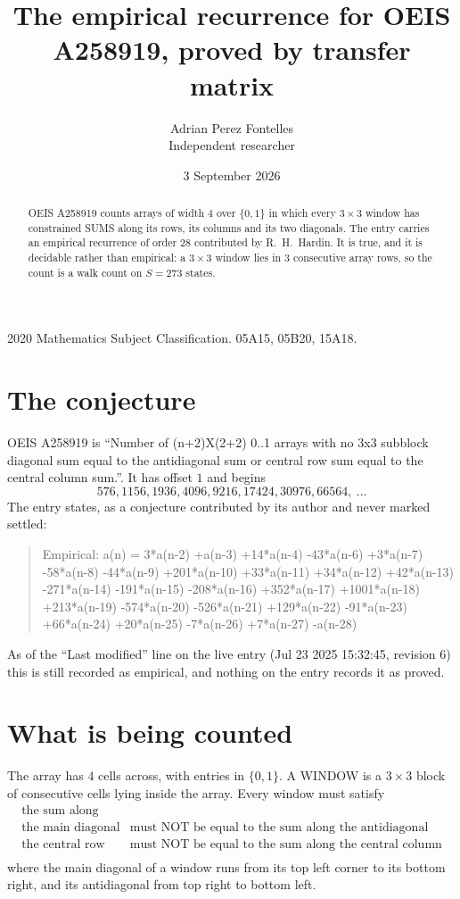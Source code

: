 \documentclass[11pt,a4paper]{article}
\title{The empirical recurrence for OEIS A258919, proved by transfer matrix}
\author{Adrian Perez Fontelles\\ \small Independent researcher}
\date{3 September 2026}
\theoremstyle{plain}
\theoremstyle{definition}
\begin{document}
\maketitle

\begin{abstract}
OEIS A258919 counts arrays of width $4$ over $\{0,1\}$ in which every $3\times3$ window has
constrained SUMS along its rows, its columns and its two diagonals. The entry carries an
empirical recurrence of order $28$ contributed by R.~H.~Hardin. It is true, and it is
decidable rather than empirical: a $3\times3$ window lies in $3$ consecutive array rows,
so the count is a walk count on $S=273$ states.
\end{abstract}

\noindent\small 2020 Mathematics Subject Classification. 05A15, 05B20, 15A18.\normalsize

\section{The conjecture}

OEIS A258919 is ``Number of (n+2)X(2+2) 0..1 arrays with no 3x3 subblock diagonal sum equal to the antidiagonal sum or central row sum equal to the central column sum.''. It has offset $1$ and begins
\[
576, 1156, 1936, 4096, 9216, 17424, 30976, 66564,\ \dots
\]
The entry states, as a conjecture contributed by its author and never marked settled:
\begin{quote}
Empirical: a(n) = 3*a(n-2) +a(n-3) +14*a(n-4) -43*a(n-6) +3*a(n-7) -58*a(n-8) -44*a(n-9) +201*a(n-10) +33*a(n-11) +34*a(n-12) +42*a(n-13) -271*a(n-14) -191*a(n-15) -208*a(n-16) +352*a(n-17) +1001*a(n-18) +213*a(n-19) -574*a(n-20) -526*a(n-21) +129*a(n-22) -91*a(n-23) +66*a(n-24) +20*a(n-25) -7*a(n-26) +7*a(n-27) -a(n-28)
\end{quote}
As of the ``Last modified'' line on the live entry (Jul 23 2025 15:32:45, revision 6) this is still
recorded as empirical, and nothing on the entry records it as proved.

\section{What is being counted}

The array has $4$ cells across, with entries in $\{0,1\}$. A WINDOW is a $3\times3$ block
of consecutive cells lying inside the array. Every window must satisfy
\[
\begin{array}{ll}
\text{the sum along} & \text{} \\[2pt]
\text{the main diagonal} & \text{must NOT be equal to the sum along the antidiagonal} \\
\text{the central row} & \text{must NOT be equal to the sum along the central column} \\
\end{array}
\]
where the main diagonal of a window runs from its top left corner to its bottom right, and its
antidiagonal from top right to bottom left.
\end{document}
